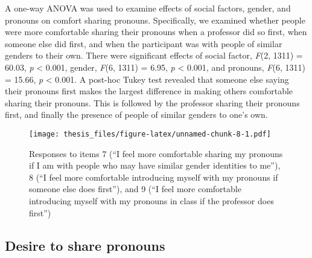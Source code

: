 \documentclass[12pt,twoside]{reedthesis}
\begin{document}
A one-way ANOVA was used to examine effects of social factors, gender, and pronouns on comfort sharing pronouns. Specifically, we examined whether people were more comfortable sharing their pronouns when a professor did so first, when someone else did first, and when the participant was with people of similar genders to their own. There were significant effects of social factor, \emph{F}(2, 1311) = 60.03, \emph{p} \textless{} 0.001, gender, \emph{F}(6, 1311) = 6.95, \emph{p} \textless{} 0.001, and pronouns, \emph{F}(6, 1311) = 15.66, \emph{p} \textless{} 0.001. A post-hoc Tukey test revealed that someone else saying their pronouns first makes the largest difference in making others comfortable sharing their pronouns. This is followed by the professor sharing their pronouns first, and finally the presence of people of similar genders to one's own.
\begin{figure}
\centering
\texttt{[image: thesis\_files/figure-latex/unnamed-chunk-8-1.pdf]}
\caption{\label{fig:unnamed-chunk-8}Responses to items 7 (``I feel more comfortable sharing my pronouns if I am with people who may have similar gender identities to me''), 8 (``I feel more comfortable introducing myself with my pronouns if someone else does first''), and 9 (``I feel more comfortable introducing myself with my pronouns in class if the professor does first'')}
\end{figure}
\hypertarget{desire-to-share-pronouns}{%
\subsection{Desire to share pronouns}\label{desire-to-share-pronouns}}
\end{document}

